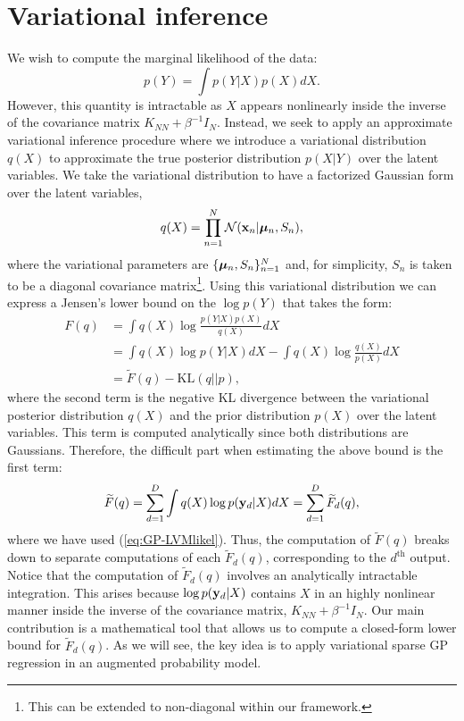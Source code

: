 \documentclass[twoside,times]{article}
\newcommand{\neil}[1]{\textbf{\textcolor{red}{Neil: #1}}}
\begin{document}
\section{Variational inference \label{sec:varInf}} 

We wish to compute the marginal likelihood of the data:
\begin{equation}
p(Y) =  \int p(Y|X) p(X) d X.
\end{equation}    
However, this quantity is intractable as $X$ appears nonlinearly
inside the inverse of the covariance matrix $K_{NN} + \beta^{-1}I_N$. Instead, we seek to
apply an approximate variational inference procedure where we
introduce a variational distribution $q(X)$ to approximate the true
posterior distribution $p(X|Y)$ over the latent variables.  We take
the variational distribution to have a factorized Gaussian form over
the latent variables,
\begin{equation}
q(X) = \prod_{n=1}^N \mathcal{N}(\mathbf{x}_n|\bm{\mu}_n,S_n), 
\end{equation}
where the variational parameters are $\{\bm{\mu}_n,S_n\}_{n=1}^N$ and,
for simplicity, $S_n$ is taken to be a diagonal covariance
matrix\footnote{This can be extended to non-diagonal within our
  framework.}. Using this variational distribution we can express a
Jensen's lower bound on the $\log p(Y)$ that takes the form:
\begin{align}
F(q) & = 
 \int q(X) \log \frac{p(Y|X)
  p(X)}{q(X)} d X \nonumber \\
 & =  \int q(X) \log p(Y|X) d X  
 - \int q(X) \log \frac{q(X)}{p(X)} d X  \nonumber \\ 
 & =  \widetilde{F} (q)   -  \text{KL}(q||p),
\label{eq:gplvmbound}
\end{align}
where the second term is the negative KL divergence between the
variational posterior distribution $q(X)$ and the prior distribution
$p(X)$ over the latent variables. This term is computed
analytically since both distributions are Gaussians. 
Therefore, the
difficult part when estimating the above bound is the first term:
\begin{equation} 
\widetilde{F} (q) = \sum_{d=1}^D \int q(X) \log p(\mathbf{y}_d|X) d X = \sum_{d=1}^D \widetilde{F}_d (q), 
\label{eq:fD}
\end{equation}  
where we have used (\ref{eq:GP-LVMlikel}). Thus, the computation of
$\widetilde{F} (q)$ breaks down to separate computations of each
$\widetilde{F}_d (q)$, corresponding to the $d^{\text{th}}$ output.  Notice that
the computation of $\widetilde{F}_d (q)$ involves an analytically
intractable integration. This arises because $\log p(\mathbf{y}_d|X)$
contains $X$ in an highly nonlinear manner inside the inverse of
the covariance matrix, $K_{NN} + \beta^{-1} I_N$. Our main contribution
is a mathematical tool that allows us to compute a closed-form lower
bound for $\widetilde{F}_d (q)$. As we will see, the key idea is to
apply variational sparse GP regression in an augmented probability
model.
\end{document}
